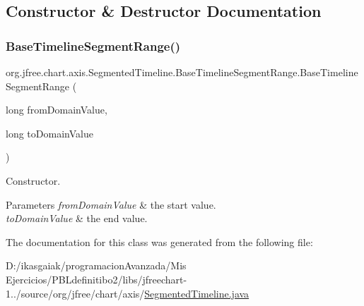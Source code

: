 \subsection{Constructor \& Destructor Documentation}
\mbox{\label{classorg_1_1jfree_1_1chart_1_1axis_1_1_segmented_timeline_1_1_base_timeline_segment_range_aeb6407215582d99cba14acd7a1532b59}} 
\subsubsection{\texorpdfstring{Base\+Timeline\+Segment\+Range()}{BaseTimelineSegmentRange()}}
{\footnotesize\ttfamily org.\+jfree.\+chart.\+axis.\+Segmented\+Timeline.\+Base\+Timeline\+Segment\+Range.\+Base\+Timeline\+Segment\+Range (\begin{DoxyParamCaption}\item[{long}]{from\+Domain\+Value,  }\item[{long}]{to\+Domain\+Value }\end{DoxyParamCaption})}

Constructor.


\begin{DoxyParams}{Parameters}
{\em from\+Domain\+Value} & the start value. \\
\hline
{\em to\+Domain\+Value} & the end value. \\
\hline
\end{DoxyParams}


The documentation for this class was generated from the following file\+:\begin{DoxyCompactItemize}
\item 
D\+:/ikasgaiak/programacion\+Avanzada/\+Mis Ejercicios/\+P\+B\+Ldefinitibo2/libs/jfreechart-\/1../source/org/jfree/chart/axis/\mbox{\hyperlink{_segmented_timeline_8java}{Segmented\+Timeline.\+java}}\end{DoxyCompactItemize}

